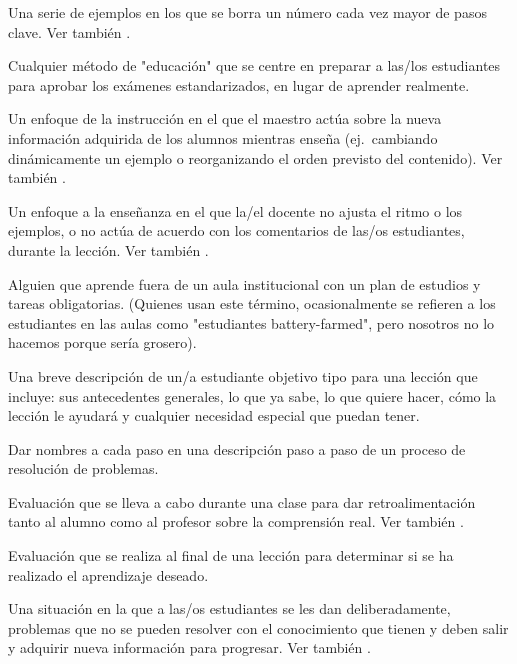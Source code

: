 \begin{description}
 Una serie de ejemplos en los que 
se borra un número cada vez mayor de pasos clave. Ver
también .

 Cualquier método de "educación" 
que se centre en preparar a las/los estudiantes para aprobar los exámenes estandarizados, en lugar de aprender realmente.

 Un enfoque de la instrucción en el que el
maestro actúa sobre la nueva información adquirida de los alumnos mientras enseña (ej.\ cambiando
dinámicamente un ejemplo o reorganizando el orden previsto del contenido).
Ver también .

 Un enfoque a la enseñanza en el que la/el docente no ajusta el ritmo o los ejemplos, o no actúa de acuerdo con los comentarios de las/os estudiantes, durante la lección.  Ver también .

 Alguien que aprende fuera de un aula institucional con un plan de estudios y tareas obligatorias. (Quienes usan este término, ocasionalmente se refieren a los estudiantes en las aulas como "estudiantes battery-farmed", pero nosotros no lo hacemos porque sería grosero).

 Una breve descripción de un/a estudiante objetivo tipo para una lección que incluye: sus antecedentes generales, lo que ya sabe, lo que quiere hacer, cómo la lección le ayudará y cualquier necesidad especial que puedan tener.

 Dar nombres a cada paso en una descripción paso a paso de un proceso de resolución de problemas.

 Evaluación que se lleva a cabo 
durante una clase para dar retroalimentación tanto al alumno como al profesor 
sobre la comprensión real. Ver también .

 Evaluación que se realiza al final de una lección para determinar si se ha realizado el aprendizaje deseado.

 Una situación en la que a las/os estudiantes se les dan deliberadamente, problemas que no se pueden resolver con el conocimiento que tienen y deben salir y adquirir nueva información para progresar. 
Ver también .


\end{description}
